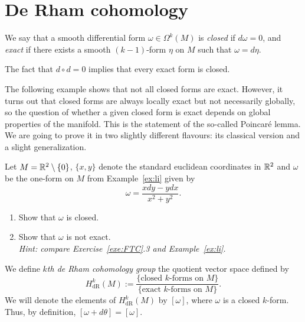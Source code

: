 \section{De Rham cohomology}
\begin{definition}
	We say that a smooth differential form $\omega\in\Omega^k(M)$ is \emph{closed} if $d\omega = 0$, and \emph{exact} if there exists a smooth $(k-1)$-form $\eta$ on $M$ such that $\omega = d\eta$.

	The fact that $d\circ d = 0$ implies that every exact form is closed.
\end{definition}

The following example shows that not all closed forms are exact.
However, it turns out that closed forms are always locally exact but not necessarily globally, so the question of whether a given closed form is exact depends on global properties of the manifold.
This is the statement of the so-called Poincar\'e lemma.
We are going to prove it in two slightly different flavours: its classical version and a slight generalization.

\begin{exercise}
	Let $M=\mathbb{R}^2\setminus\{0\}$, $\{x,y\}$ denote the standard euclidean coordinates in $\mathbb{R}^2$ and $\omega$ be the one-form on $M$ from Example~\ref{ex:li} given by
	\begin{equation}
		\omega = \frac{xdy - ydx}{x^2+y^2}.
	\end{equation}
	\begin{enumerate}
		\item Show that $\omega$ is closed.
		\item Show that $\omega$ is not exact.\\
		      \textit{\small Hint: compare Exercise~\ref{exe:FTC}.3 and Example~\ref{ex:li}.}
	\end{enumerate}
\end{exercise}

\begin{definition}
	We define \emph{$k$th de Rham cohomology group} the quotient vector space defined by
	\begin{equation}
		H_{\mathrm{dR}}^k(M) := \frac{\{\mbox{closed $k$-forms on $M$}\}}{\{\mbox{exact $k$-forms on $M$}\}}.
	\end{equation}
	We will denote the elements of $H_{\mathrm{dR}}^k(M)$ by $[\omega]$, where $\omega$ is a closed $k$-form. Thus, by definition, $[\omega + d\theta] = [\omega]$.
\end{definition}


